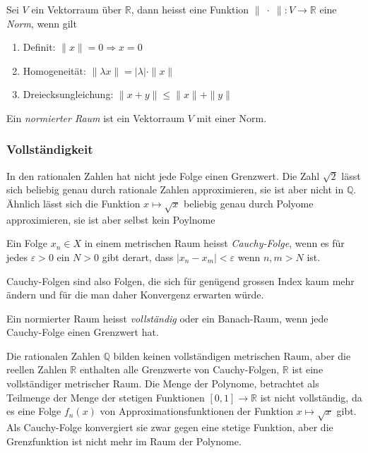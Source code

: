 \begin{definition}
\label{buch:skalaprodukt:funktionenraume:def:norm}
Sei $V$ ein Vektorraum über $\mathbb{R}$, dann heisst eine Funktion
\( \|\;\cdot\;\| \colon V \to \mathbb{R}\) eine {\em Norm}, wenn gilt
\begin{enumerate}
\item
Definit: $ \|x\| = 0 \Rightarrow x=0$
\item
Homogeneität: $ \| \lambda x \| = |\lambda| \cdot \|x\|$
\item
Dreiecksungleichung: $\|x+y\| \le \|x\| + \|y\|$
\end{enumerate}
Ein {\em normierter Raum} ist ein Vektorraum $V$ mit einer Norm.
\end{definition}

%
%
\subsubsection{Vollständigkeit}
In den rationalen Zahlen hat nicht jede Folge einen Grenzwert.
Die Zahl $\sqrt{2}$ lässt sich beliebig genau durch rationale Zahlen
approximieren, sie ist aber nicht in $\mathbb{Q}$.
Ähnlich lässt sich die Funktion $x\mapsto \sqrt{x}$ beliebig genau 
durch Polyome approximieren, sie ist aber selbst kein Poylnome

\begin{definition}
Ein Folge $x_n\in X$ in einem metrischen Raum heisst {\em Cauchy-Folge},
wenn es für jedes $\varepsilon>0$ ein $N>0$ gibt derart, dass 
$|x_n-x_m|<\varepsilon$ wenn $n,m>N$ ist.
\end{definition}

Cauchy-Folgen sind also Folgen, die sich für genügend grossen Index
kaum mehr ändern und für die man daher Konvergenz erwarten würde.

\begin{definition}
Ein normierter Raum heisst {\em vollständig} oder ein Banach-Raum,
wenn jede Cauchy-Folge einen Grenzwert hat.
\end{definition}

Die rationalen Zahlen $\mathbb{Q}$ bilden keinen vollständigen
metrischen Raum, aber die reellen Zahlen $\mathbb{R}$ enthalten
alle Grenzwerte von Cauchy-Folgen, $\mathbb{R}$ ist eine vollständiger
metrischer Raum.
Die Menge der Polynome, betrachtet als Teilmenge der Menge der
stetigen Funktionen $[0,1]\to\mathbb{R}$ ist nicht vollständig,
da es eine Folge $f_n(x)$ von Approximationsfunktionen der Funktion
$x\mapsto \sqrt{x}$ gibt.
Als Cauchy-Folge konvergiert sie zwar gegen eine stetige Funktion,
aber die Grenzfunktion ist nicht mehr im Raum der Polynome.

